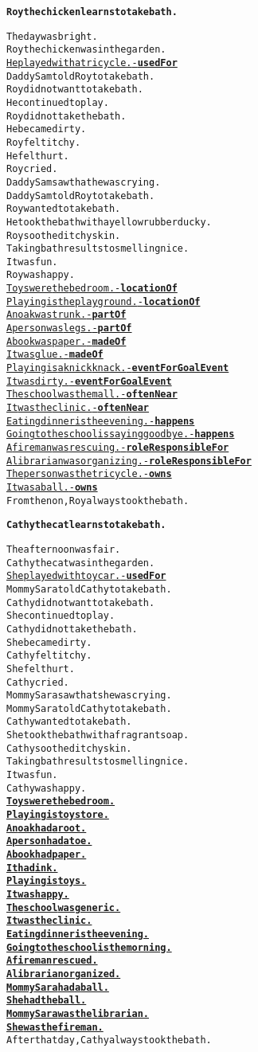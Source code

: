 \begin{alltt}
\textbf{Roy the chicken learns to take bath.}

The day was bright.
Roy the chicken was in the garden.
\underline{He played with a tricycle. - \textbf{usedFor}}
Daddy Sam told Roy to take bath.
Roy did not want to take bath.
He continued to play.
Roy did not take the bath.
He became dirty.
Roy felt itchy.
He felt hurt.
Roy cried.
Daddy Sam saw that he was crying.
Daddy Sam told Roy to take bath.
Roy wanted to take bath.
He took the bath with a yellow rubber ducky.
Roy soothed itchy skin.
Taking bath results to smelling nice.
It was fun.
Roy was happy.
\underline{Toys were the bedroom. - \textbf{locationOf}}
\underline{Playing is the playground. - \textbf{locationOf}}
\underline{An oak was trunk. - \textbf{partOf}}
\underline{A person was legs. - \textbf{partOf}}
\underline{A book was paper. - \textbf{madeOf}}
\underline{It was glue. - \textbf{madeOf}}
\underline{Playing is a knick knack. - \textbf{eventForGoalEvent}}
\underline{It was dirty. - \textbf{eventForGoalEvent}}
\underline{The school was the mall. - \textbf{oftenNear}}
\underline{It was the clinic. - \textbf{oftenNear}}
\underline{Eating dinner is the evening. - \textbf{happens}}
\underline{Going to the school is saying goodbye. - \textbf{happens}}
\underline{A fireman was rescuing. - \textbf{roleResponsibleFor}}
\underline{A librarian was organizing. - \textbf{roleResponsibleFor}}
\underline{The person was the tricycle. - \textbf{owns}}
\underline{It was a ball. - \textbf{owns}}
From then on, Roy always took the bath.
\end{alltt}

\begin{alltt}
\textbf{Cathy the cat learns to take bath.}

The afternoon was fair.
Cathy the cat was in the garden.
\underline{She played with toy car. - \textbf{usedFor}}
Mommy Sara told Cathy to take bath.
Cathy did not want to take bath.
She continued to play.
Cathy did not take the bath.
She became dirty.
Cathy felt itchy.
She felt hurt.
Cathy cried.
Mommy Sara saw that she was crying.
Mommy Sara told Cathy to take bath.
Cathy wanted to take bath.
She took the bath with a fragrant soap.
Cathy soothed itchy skin.
Taking bath results to smelling nice.
It was fun.
Cathy was happy.
\underline{\textbf{Toys were the bedroom.}}
\underline{\textbf{Playing is toy store.}}
\underline{\textbf{An oak had a root.}}
\underline{\textbf{A person had a toe.}}
\underline{\textbf{A book had paper.}}
\underline{\textbf{It had ink.}}
\underline{\textbf{Playing is toys.}}
\underline{\textbf{It was happy.}}
\underline{\textbf{The school was generic.}}
\underline{\textbf{It was the clinic.}}
\underline{\textbf{Eating dinner is the evening.}}
\underline{\textbf{Going to the school is the morning.}}
\underline{\textbf{A fireman rescued.}}
\underline{\textbf{A librarian organized.}}
\underline{\textbf{Mommy Sara had a ball.}}
\underline{\textbf{She had the ball.}}
\underline{\textbf{Mommy Sara was the librarian.}}
\underline{\textbf{She was the fireman.}}
After that day, Cathy always took the bath.
\end{alltt}

